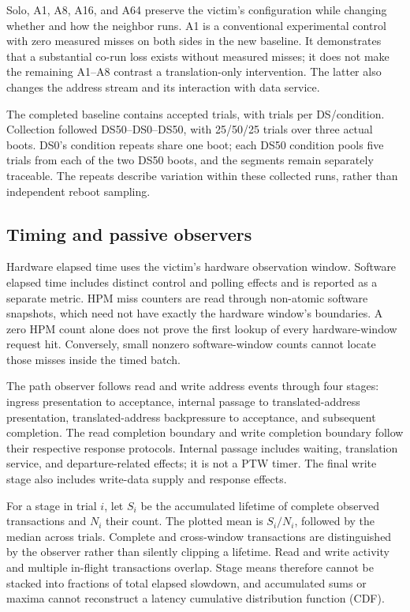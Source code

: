 Solo, A1, A8, A16, and A64 preserve the victim's configuration while changing whether and how the neighbor runs. A1 is a conventional experimental control with zero measured misses on both sides in the new baseline. It demonstrates that a substantial co-run loss exists without measured misses; it does not make the remaining A1--A8 contrast a translation-only intervention. The latter also changes the address stream and its interaction with data service.

The completed baseline contains \BaselineTotalRuns{} accepted trials, with \RunsPerCondition{} trials per DS/condition. Collection followed DS50--DS0--DS50, with 25/50/25 trials over three actual boots. DS0's condition repeats share one boot; each DS50 condition pools five trials from each of the two DS50 boots, and the segments remain separately traceable. The repeats describe variation within these collected runs, rather than independent reboot sampling.

\subsection{Timing and passive observers}
Hardware elapsed time uses the victim's hardware observation window. Software elapsed time includes distinct control and polling effects and is reported as a separate metric. HPM miss counters are read through non-atomic software snapshots, which need not have exactly the hardware window's boundaries. A zero HPM count alone does not prove the first lookup of every hardware-window request hit. Conversely, small nonzero software-window counts cannot locate those misses inside the timed batch.

The path observer follows read and write address events through four stages: ingress presentation to acceptance, internal passage to translated-address presentation, translated-address backpressure to acceptance, and subsequent completion. The read completion boundary and write completion boundary follow their respective response protocols. Internal passage includes waiting, translation service, and departure-related effects; it is not a PTW timer. The final write stage also includes write-data supply and response effects.

For a stage in trial $i$, let $S_i$ be the accumulated lifetime of complete observed transactions and $N_i$ their count. The plotted mean is $S_i/N_i$, followed by the median across trials. Complete and cross-window transactions are distinguished by the observer rather than silently clipping a lifetime. Read and write activity and multiple in-flight transactions overlap. Stage means therefore cannot be stacked into fractions of total elapsed slowdown, and accumulated sums or maxima cannot reconstruct a latency cumulative distribution function (CDF).

